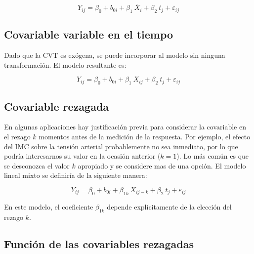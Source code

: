 \documentclass[spanish]{article}
\numberwithin{figure}{subsection}
\numberwithin{equation}{subsection}
\numberwithin{table}{subsection}
\begin{document}
\[ Y_{ij} = \beta_0 + b_{0i} + \beta_1\ \overline{X}_i + \beta_2\ t_j + \varepsilon_{ij} \]


\subsection{Covariable variable en el tiempo}

Dado que la CVT es exógena, se puede incorporar al modelo sin ninguna
transformación. El modelo resultante es:

\[ Y_{ij} = \beta_0 + b_{0i} + \beta_1\ X_{ij} + \beta_2\ t_j + \varepsilon_{ij} \]


\subsection{Covariable rezagada}

En algunas aplicaciones hay justificación previa para considerar la covariable
en el rezago $k$ momentos antes de la medición de la respuesta. Por ejemplo, el
efecto del IMC sobre la tensión arterial probablemente no sea inmediato, por lo
que podría interesarnos su valor en la ocasión anterior ($k=1$). Lo más común es
que se desconozca el valor $k$ apropiado y se considere mas de una opción. El
modelo lineal mixto se definiría de la siguiente manera:

\[ Y_{ij} = \beta_0 + b_{0i} + \beta_{1k}\ X_{ij-k} + \beta_2\ t_j + \varepsilon_{ij} \]

En este modelo, el coeficiente $\beta_{1k}$ depende explícitamente de la
elección del rezago $k$.


\subsection{Función de las covariables rezagadas}
\end{document}
